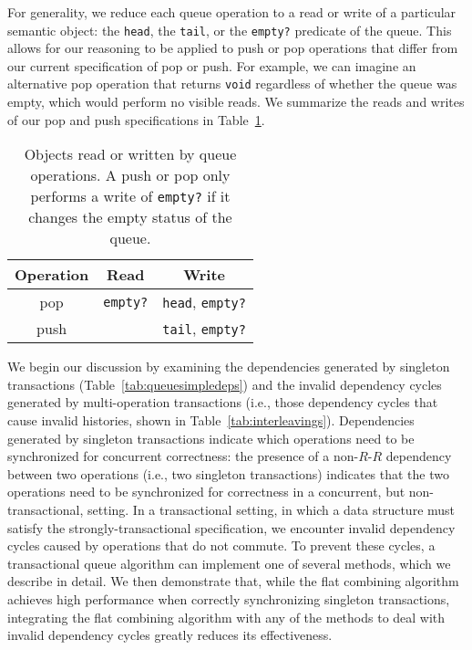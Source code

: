 For generality, we reduce each queue operation to a read or write of a particular semantic object: the \texttt{head}, the \texttt{tail}, or the \texttt{empty?} predicate of the queue. This allows for our reasoning to be applied to push or pop operations that differ from our current specification of pop or push. For example, we can imagine an alternative pop operation that returns \texttt{void} regardless of whether the queue was empty, which would perform no visible reads. We summarize the reads and writes of our pop and push specifications in Table~\ref{table:qrw}.

\begin{table}[t]
\centering
\begin{tabular}{c||c|c}
    Operation & Read & Write\\
    \hline
    pop & \texttt{empty?} & \texttt{head}, \texttt{empty?}\\
    push & & \texttt{tail}, \texttt{empty?}\\
\end{tabular}
    \caption[Objects read or written by queue operations]{Objects read or written by queue operations. A push or pop only performs a write of \texttt{empty?} if it changes the empty status of the queue.}
    \label{table:qrw}
\end{table}

We begin our discussion by examining the dependencies generated by singleton transactions (Table~\ref{tab:queuesimpledeps}) and the invalid dependency cycles generated by multi-operation transactions (i.e., those dependency cycles that cause invalid histories, shown in Table~\ref{tab:interleavings}). 
Dependencies generated by singleton transactions indicate which operations need to be synchronized for concurrent correctness: the presence of a non-$R$-$R$ dependency between two operations (i.e., two singleton transactions) indicates that the two operations need to be synchronized for correctness in a concurrent, but non-transactional, setting.
In a transactional setting, in which a data structure must satisfy the strongly-transactional specification, we encounter invalid dependency cycles caused by operations that do not commute. To prevent these cycles, a transactional queue algorithm can implement one of several methods, which we describe in detail.
We then demonstrate that, while the flat combining algorithm achieves high performance when correctly synchronizing singleton transactions, integrating the flat combining algorithm with any of the methods to deal with invalid dependency cycles greatly reduces its effectiveness.

